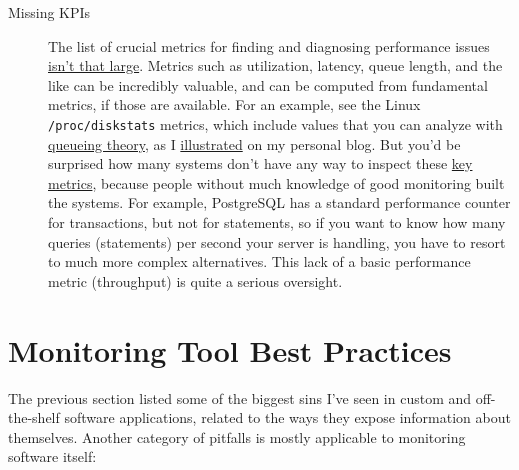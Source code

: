 \documentclass{vivid_layout}
\begin{document}
\begin{description}
\item[Missing KPIs] The list of crucial metrics for finding and diagnosing
performance issues
\href{http://www.xaprb.com/blog/2011/10/06/fundamental-performance-and-scalability-instrumentation/}{isn't
that large}. Metrics such as utilization, latency, queue length, and the
like can be incredibly valuable, and can be computed from fundamental metrics, if
those are available. For an example, see the Linux \texttt{/proc/diskstats}
metrics, which include values that you can analyze with
\href{https://www.vividcortex.com/resources/queueing-theory/}{queueing theory},
as I
\href{http://www.xaprb.com/blog/2010/01/09/how-linux-iostat-computes-its-results/}{illustrated}
on my personal blog. But you'd be surprised how many systems don't have any way
to inspect these \href{http://www.brendangregg.com/usemethod.html}{key metrics},
because people without much knowledge of good monitoring built the systems. For example,
PostgreSQL has a standard performance counter for transactions, but not for
statements, so if you want to know how many queries (statements) per second your
server is handling, you have to resort to much more complex alternatives. This
lack of a basic performance metric (throughput) is quite a serious oversight.

\end{description}

\section{Monitoring Tool Best Practices}

The previous section listed some of the biggest sins I've seen in custom and off-the-shelf
software applications, related to the ways they expose information about
themselves. Another category of pitfalls is mostly applicable to
monitoring software itself:
\end{document}
